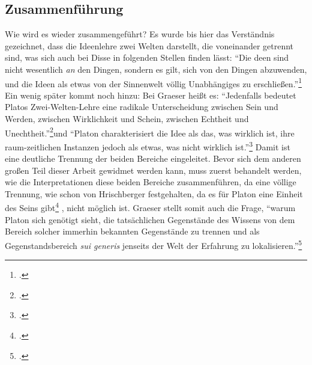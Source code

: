 \subsection*{Zusammenführung}
Wie wird es wieder zusammengeführt?
Es wurde bis hier das Verständnis gezeichnet, dass die Ideenlehre zwei Welten darstellt, die voneinander getrennt sind, was sich auch bei Disse in folgenden Stellen finden lässt:
\enquote{Die deen sind nicht wesentlich \emph{an} den Dingen, sondern es gilt, sich von den Dingen abzuwenden, und die Ideen als etwas von der Sinnenwelt völlig Unabhängiges zu erschließen.}\footcite[][S. 32]{DisseMetaphysik}
Ein wenig später kommt noch hinzu: 
Bei Graeser heißt es: 
\enquote{Jedenfalls bedeutet Platos Zwei-Welten-Lehre eine radikale Unterscheidung zwischen Sein und Werden, zwischen Wirklichkeit und Schein, zwischen Echtheit und Unechtheit.}\footcite[][S. 134]{GraeserPhiloGeschichte}und 
\enquote{Platon charakterisiert die Idee als das, was wirklich ist, ihre raum-zeitlichen Instanzen jedoch als etwas, was nicht wirklich ist.}\footcite[][S. 139]{GraeserPhiloGeschichte}
Damit ist eine deutliche Trennung der beiden Bereiche eingeleitet. 
Bevor sich dem anderen großen Teil dieser Arbeit gewidmet werden kann, muss zuerst behandelt werden, wie die Interpretationen diese beiden Bereiche zusammenführen, da eine völlige Trennung, wie schon von Hrischberger festgehalten, da es für Platon eine Einheit des Seins gibt\footcite[vgl][S. 100]{Hirschberger} , nicht möglich ist.
Graeser stellt somit auch die Frage, \enquote{warum Platon sich genötigt sieht, die tatsächlichen Gegenstände des Wissens von dem Bereich solcher immerhin bekannten Gegenstände zu trennen und als Gegenstandsbereich \emph{sui generis} jenseits der Welt der Erfahrung zu lokalisieren.}\footcite[][S. 135]{GraeserPhiloGeschichte}
